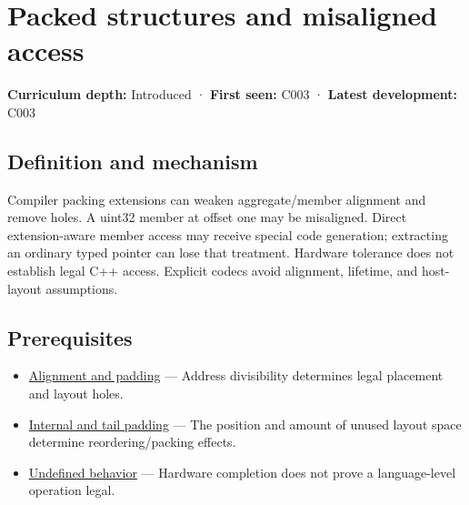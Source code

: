 \hypertarget{appendix-0682dbfc5f0e}{}\label{referencestart:appendix-0682dbfc5f0e}
\section{Packed structures and misaligned access}\label{appendix-0682dbfc5f0e-packed-structures-and-misaligned-access}

\hypertarget{appendix-0682dbfc5f0e-packed-structures-and-misaligned-access}{}

\textbf{Curriculum depth:} Introduced · \textbf{First seen:} C003 · \textbf{Latest development:} C003

\begin{allmightroledefinition}

\subsection{Definition and mechanism}\label{appendix-0682dbfc5f0e-definition-and-mechanism}

\hypertarget{appendix-0682dbfc5f0e-definition-and-mechanism}{}

Compiler packing extensions can weaken aggregate/member alignment and remove holes. A uint32 member at offset one may be misaligned. Direct extension-aware member access may receive special code generation; extracting an ordinary typed pointer can lose that treatment. Hardware tolerance does not establish legal C++ access. Explicit codecs avoid alignment, lifetime, and host-layout assumptions.

\end{allmightroledefinition}

\subsection{Prerequisites}\label{appendix-0682dbfc5f0e-prerequisites}

\hypertarget{appendix-0682dbfc5f0e-prerequisites}{}

\begin{itemize}
\tightlist
\item
  \hyperref[appendix-a1f7c53b4742]{Alignment and padding} --- Address divisibility determines legal placement and layout holes.
\item
  \hyperref[appendix-f52f8c5a3afd]{Internal and tail padding} --- The position and amount of unused layout space determine reordering/packing effects.
\item
  \hyperref[appendix-f558f5b4d8f2]{Undefined behavior} --- Hardware completion does not prove a language-level operation legal.
\end{itemize}

